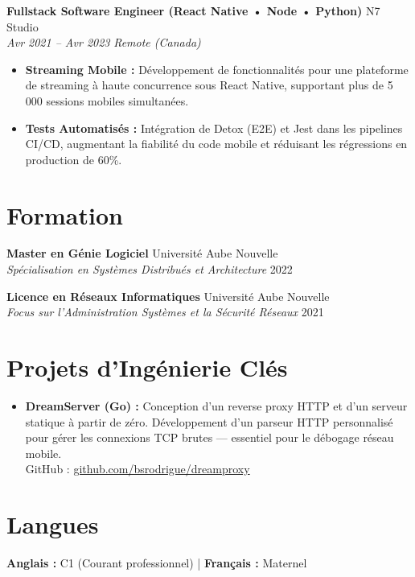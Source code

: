 \documentclass[a4paper,10pt]{article}
\newcommand{\jobheader}[4]{%
    \textbf{#1} \hfill #2 \\
    \textit{#3} \hfill \textit{#4}
    \vspace{0.05cm}
}
\begin{document}
\vspace{0.15cm}

\jobheader{Fullstack Software Engineer (React Native • Node • Python)}{N7 Studio}{Avr 2021 -- Avr 2023}{Remote (Canada)}
\begin{itemize}[leftmargin=*,nosep]
    \item \textbf{Streaming Mobile :} Développement de fonctionnalités pour une plateforme de streaming à haute concurrence sous React Native, supportant plus de 5 000 sessions mobiles simultanées.
    \item \textbf{Tests Automatisés :} Intégration de Detox (E2E) et Jest dans les pipelines CI/CD, augmentant la fiabilité du code mobile et réduisant les régressions en production de 60\%.
\end{itemize}

\section*{Formation}
\textbf{Master en Génie Logiciel} \hfill Université Aube Nouvelle \\
\textit{Spécialisation en Systèmes Distribués et Architecture} \hfill 2022

\textbf{Licence en Réseaux Informatiques} \hfill Université Aube Nouvelle \\
\textit{Focus sur l'Administration Systèmes et la Sécurité Réseaux} \hfill 2021

\section*{Projets d'Ingénierie Clés}
\begin{itemize}[leftmargin=*,nosep]
    \item \textbf{DreamServer (Go) :} Conception d'un reverse proxy HTTP et d'un serveur statique à partir de zéro. Développement d'un parseur HTTP personnalisé pour gérer les connexions TCP brutes — essentiel pour le débogage réseau mobile. \\
    GitHub : \href{https://github.com/bsrodrigue/dreamproxy}{github.com/bsrodrigue/dreamproxy}
\end{itemize}

\section*{Langues}
\textbf{Anglais :} C1 (Courant professionnel) | \textbf{Français :} Maternel
\end{document}
